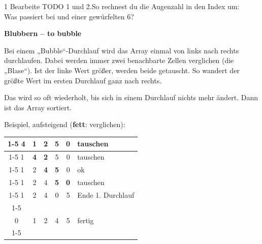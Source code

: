 \documentclass[11pt,a4paper]{article}
\begin{document}

\begin{aufgabe}{1}
{\lueckentext Bearbeite TODO 1 und 2.\quad So rechnest du die Augenzahl in den Index um: \\
Was passiert bei  und einer gewürfelten 6?}
\end{aufgabe}

\begin{minipage}[t]{0.6\linewidth}
\textbf{Blubbern -- to bubble}

Bei einem „Bubble“-Durchlauf wird das Array einmal von links nach rechts durchlaufen. Dabei werden immer zwei benachbarte Zellen verglichen (die „Blase“). Ist der linke Wert größer, werden beide getauscht. So wandert der größte Wert im ersten Durchlauf ganz nach rechts.

Das wird so oft wiederholt, bis sich in einem Durchlauf nichts mehr ändert. Dann ist das Array sortiert.
\end{minipage}\hfill
\begin{minipage}[t]{0.36\linewidth}
\vspace{0pt}
\small Beispiel, aufsteigend (\textbf{fett}: verglichen):\\[1mm]
\begin{tabular}{|c|c|c|c|c|l}\cline{1-5}
\textbf{4} & \textbf{1} & 2 & 5 & 0 & \scriptsize tauschen\\\cline{1-5}
1 & \textbf{4} & \textbf{2} & 5 & 0 & \scriptsize tauschen\\\cline{1-5}
1 & 2 & \textbf{4} & \textbf{5} & 0 & \scriptsize ok\\\cline{1-5}
1 & 2 & 4 & \textbf{5} & \textbf{0} & \scriptsize tauschen\\\cline{1-5}
1 & 2 & 4 & 0 & 5 & \scriptsize Ende 1. Durchlauf\\\cline{1-5}
\multicolumn{5}{c}{\ldots} & \\
0 & 1 & 2 & 4 & 5 & \scriptsize fertig\\\cline{1-5}
\end{tabular}
\end{minipage}
\end{document}
